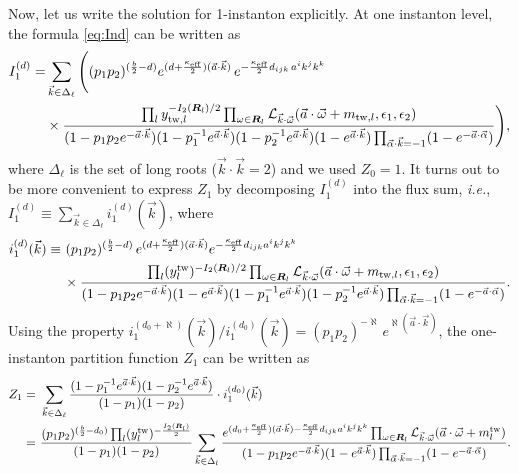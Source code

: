 \documentclass[letterpaper, 11pt]{article}
\newcommand{\nn}{\nonumber}
\def\CL{{\cal L}}
\def\a{\alpha}
\def\e{\epsilon}
\def\k{\kappa}
\def\w{\omega}
\begin{document}
Now, let us write the solution for 1-instanton explicitly. At one instanton level, the formula \eqref{eq:Ind} can be written as
 \begin{align}
  \begin{split}   \label{eq:1inst-i}
  I_1^{(d)} = &\sum_{\vec{k} \in \Delta_\ell}  \Bigg( 
     (p_1p_2)^{(\frac{b}{2}-d ) } e^{(d+\frac{\k_\text{eff}}{2})(\vec{a}\cdot\vec{k})}\,
    e^{-\frac{\k_\text{eff}}{2}d_{ijk}\,a^ik^jk^k}  \\& 
  \times \frac{\prod_{l} y_{\text{tw},l}^{-I_2(\boldsymbol{R}_l)/2} \prod_{\w \in \boldsymbol{R}_l} \CL_{\vec{k}\cdot\vec{\w}}(\vec{a}\cdot \vec{\w} + m_{\text{tw},l}, \e_1,\e_2)}{ (1-p_1p_2 e^{-\vec{a} \cdot \vec{k} })(1-p_1^{-1} e^{\vec{a} \cdot \vec{k} })(1-p_2^{-1} e^{\vec{a} \cdot \vec{k} })(1-e^{\vec{a} \cdot \vec{k} })\prod_{\vec{\a} \cdot \vec{k} = -1}(1-e^{-\vec{a}\cdot\vec{\alpha}})}
    \Bigg) , 
  \end{split}
\end{align}
where $\Delta_\ell$ is the set of long roots ($\vec{k}\cdot \vec{k} = 2$) and we used $Z_0 = 1$. 
It turns out to be more convenient to express $Z_1$ by decomposing $I_1^{(d)}$ into the flux sum, \emph{i.e.}, $I_1^{(d)} \equiv \sum_{\vec{k}\in\Delta_{\ell}} i_1^{(d)}(\vec{k})$, where
\begin{align}
  \label{eq:1inst-i-flux}
  \begin{split}
  i_{1}^{(d)}(\vec{k})\equiv &\ (p_1p_2)^{(\frac{b}{2}-d)}\,e^{(d+\frac{\kappa_{\text{eff}}}{2})(\vec{a}\cdot\vec{k})}e^{-\frac{\kappa_{\text{eff}}}{2}d_{ijk}a^ik^jk^k}\\
  &\,\times\frac{\prod_{l}(y_{l}^{\text{tw}})^{-{I_2(\boldsymbol{R}_l)}/{2}}\prod_{\w \in \boldsymbol{R}_l} \CL_{\vec{k}\cdot\vec{\w}}(\vec{a}\cdot \vec{\w} + m_{\text{tw},l}, \e_1,\e_2)}{(1-p_1p_2e^{-\vec{a}\cdot\vec{k}})(1-e^{\vec{a}\cdot\vec{k}})(1-p_1^{-1}e^{\vec{a}\cdot\vec{k}})(1-p_2^{-1}e^{\vec{a}\cdot\vec{k}})\prod_{\vec{\alpha}\cdot \vec{k}=-1}(1-e^{-\vec{a}\cdot\vec{\alpha}})}.
  \end{split}
\end{align}
Using the property $i_{1}^{(d_0+\aleph)}(\vec{k}) /i_{1}^{(d_0)}(\vec{k})=(p_1p_2)^{-\aleph}\,e^{\aleph(\vec{a}\cdot\vec{k})}$, the one-instanton partition function $Z_1$ can be written as
\begin{align}
  \label{eq:1inst-formula}
  Z_1=&\ \sum_{\vec{k}\in\Delta_\ell}\frac{(1-p_1^{-1}e^{\vec{a}\cdot\vec{k}})(1-p_2^{-1}e^{\vec{a}\cdot\vec{k}})}{(1-p_1)(1-p_2)}
  \cdot i_1^{(d_0)}(\vec{k}) 
   \\=&\ \frac{(p_1p_2)^{(\frac{b}{2}-d_0)}\prod_{l}(y_{l}^{\text{tw}})^{-{\frac{I_2(\boldsymbol{R}_l)}{2}}}}{(1-p_1)(1-p_2)} \sum_{\vec{k}\in\Delta_l}\frac{e^{(d_0+\frac{\kappa_{\text{eff}}}{2})(\vec{a}\cdot\vec{k})-\frac{\kappa_{\text{eff}}}{2}d_{ijk}a^ik^jk^k}\prod_{\w \in \boldsymbol{R}_l} \CL_{\vec{k}\cdot\vec{\w}}(\vec{a}\cdot \vec{\w} + m_{l}^\text{tw})}{(1-p_1p_2e^{-\vec{a}\cdot\vec{k}})(1-e^{\vec{a}\cdot\vec{k}})\prod_{\vec{\alpha}\cdot \vec{k}=-1}(1-e^{-\vec{a}\cdot\vec{\alpha}})} . \nn
\end{align}
\end{document}
